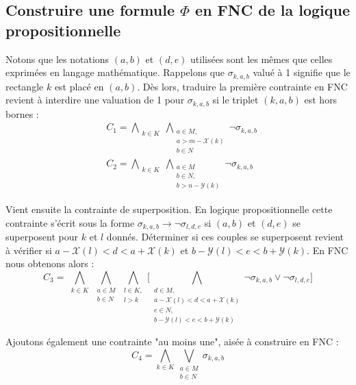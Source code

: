 \documentclass[a4paper]{article}
\begin{document}
\subsection{Construire une formule $\Phi$ en FNC de la logique propositionnelle}
Notons que les notations $(a, b)$ et $(d, e)$ utilisées sont les mêmes que celles exprimées en langage mathématique.
Rappelons que $\sigma_{k,a,b}$ valué à 1 signifie que le rectangle $k$ est placé en $(a,b)$. Dès lors, traduire la première contrainte en FNC revient à interdire une valuation de 1 pour $\sigma_{k,a,b}$ si le triplet $(k, a, b)$ est hors bornes :
\begin{equation*}
\begin{split}
	&C_1 = \bigwedge\limits_{\substack{k\in K}} \bigwedge\limits_{\substack{a \in M, \\ a > m - \mathcal{X}(k) \\ b\in N}} \lnot \sigma_{k,a, b}\\
    &C_2 = \bigwedge\limits_{\substack{k\in K}} \bigwedge\limits_{\substack{a \in M \\ b \in N,\\ b > n - \mathcal{Y}(k)}} \lnot \sigma_{k,a, b}
\end{split}
\end{equation*}

Vient ensuite la contrainte de superposition. En logique propositionnelle cette contrainte s'écrit sous la forme $\sigma_{k,a,b} \rightarrow \lnot \sigma_{l,d,e}$ si $(a,b)$ et $(d,e)$ se superposent pour $k$ et $l$ donnés. Déterminer si ces couples se superposent revient à vérifier si $a-\mathcal{X}(l) < d < a +\mathcal{X}(k)$ et $b-\mathcal{Y}(l) < e < b +\mathcal{Y}(k)$. En FNC nous obtenons alors :
\begin{equation*}
C_3 = 	\bigwedge\limits_{\substack{k\in K}}
			\bigwedge\limits_{\substack{a \in M \\ b \in N}}
				\bigwedge\limits_{\substack{l\in K,\\ l > k}}
					\bigg[
					\bigwedge\limits_{\substack{d \in M,\\ a-\mathcal{X}(l) < d < a +\mathcal{X}(k) \\  e \in N, \\b-\mathcal{Y}(l) < e < b +\mathcal{Y}(k)}}
						\lnot \sigma_{k,a,b} \lor \lnot \sigma_{l,d,e}	
					\bigg]
\end{equation*}

Ajoutons également une contrainte "au moins une", aisée à construire en FNC : 
\begin{equation*}
	C_4 = \bigwedge\limits_{k\in K} \bigvee\limits_{\substack{a\in M \\ b \in N}} \sigma_{k,a,b}
\end{equation*}
\end{document}

